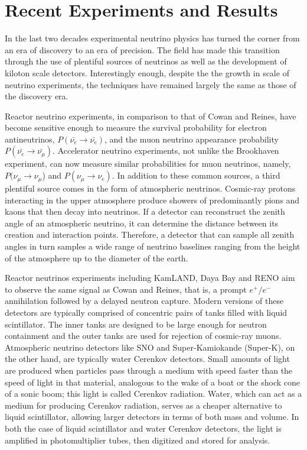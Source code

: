 \section{Recent Experiments and Results}
In the last two decades experimental neutrino physics has turned the corner from an era of discovery to an era of precision.  The field has made this transition through the use of plentiful sources of neutrinos as well as the development of kiloton scale detectors.  Interestingly enough, despite the the growth in scale of neutrino experiments, the techniques have remained largely the same as those of the discovery era.  

Reactor neutrino experiments, in comparison to that of Cowan and Reines, have become sensitive enough to measure the survival probability for electron antineutrinos, $P(\bar{\nu_e} \rightarrow \bar{\nu_e})$, and the muon neutrino appearance probability $P(\bar{\nu_e} \rightarrow \bar{\nu_\mu})$.  Accelerator neutrino experiments, not unlike the Brookhaven experiment, can now measure similar probabilities for muon neutrinos, namely, $P(\nu_\mu \rightarrow \nu_\mu$) and $P(\nu_\mu \rightarrow \nu_e)$.  In addition to these common sources, a third plentiful source comes in the form of atmospheric neutrinos.  Cosmic-ray protons interacting in the upper atmosphere produce showers of predominantly pions and kaons that then decay into neutrinos.  If a detector can reconstruct the zenith angle of an atmospheric neutrino, it can determine the distance between its creation and interaction points.  Therefore, a detector that can sample all zenith angles in turn samples a wide range of neutrino baselines ranging from the height of the atmosphere up to the diameter of the earth.  

Reactor neutrinos experiments including KamLAND, Daya Bay and RENO aim to observe the same signal as Cowan and Reines, that is, a prompt $e^+/e^-$ annihilation followed by a delayed neutron capture.\cite{kamland, dayaBay, reno}  Modern versions of these detectors are typically comprised of concentric pairs of tanks filled with liquid scintillator.  The inner tanks are designed to be large enough for neutron containment and the outer tanks are used for rejection of cosmic-ray muons.   Atmospheric neutrino detectors like SNO and Super-Kamiokande (Super-K), on the other hand, are typically water Cerenkov detectors.  Small amounts of light are produced when particles pass through a medium with speed faster than the speed of light in that material, analogous to the wake of a boat or the shock cone of a sonic boom; this light is called Cerenkov radiation.  Water, which can act as a medium for producing Cerenkov radiation, serves as a cheaper alternative to liquid scintillator, allowing larger detectors in terms of both mass and volume.  In both the case of liquid scintillator and water Cerenkov detectors, the light is amplified in photomultiplier tubes, then digitized and stored for analysis.  

